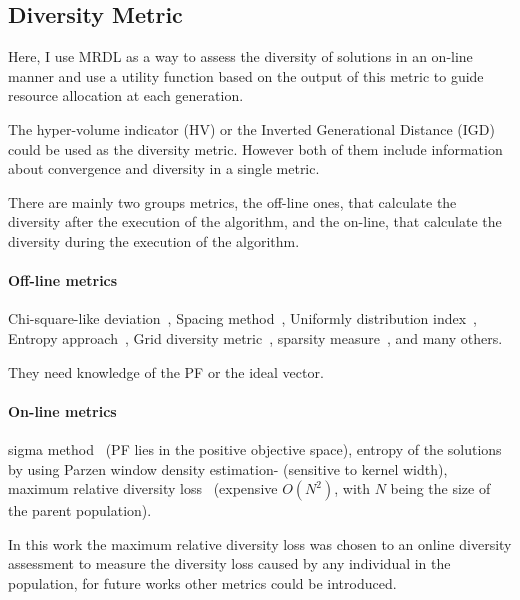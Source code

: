 \subsection{Diversity Metric}

Here, I use MRDL as a way to assess the diversity of solutions in an on-line manner and use a utility function based on the output of this metric to guide resource allocation at each generation. 

The hyper-volume indicator (HV) or the Inverted Generational Distance (IGD)  could be used as the diversity metric. However both of them include information about convergence and diversity in a single metric.

There are mainly two groups metrics, the off-line ones, that calculate the diversity after the execution of the algorithm, and the on-line, that calculate the diversity during the execution of the algorithm. 

\paragraph{Off-line metrics} Chi-square-like deviation~\cite{deb1989genetic}, Spacing method~\cite{scott1995fault}, Uniformly distribution index~\cite{tan2002evolutionary}, Entropy approach~\cite{farhang2002diversity}, Grid diversity metric~\cite{deb2002running}, sparsity measure~\cite{deb2003fast}, and many others. 

They need knowledge of the PF or the ideal vector.

\paragraph{On-line metrics}sigma method~\cite{mostaghim2003strategies}  (PF lies in the positive objective space), 
entropy of the solutions by using Parzen window density estimation-\cite{tan2008evolutionary} (sensitive to kernel width), maximum relative diversity loss~\cite{gee2015online} (expensive $O(N^2)$, with $N$ being the size of the parent population).

In this work the maximum relative diversity loss was chosen to an online diversity assessment to measure the diversity loss caused by any individual in the population, for future works other metrics could be introduced.



